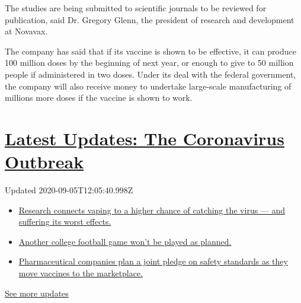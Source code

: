 The studies are being submitted to scientific journals to be reviewed
for publication, said Dr. Gregory Glenn, the president of research and
development at Novavax.

The company has said that if its vaccine is shown to be effective, it
can produce 100 million doses by the beginning of next year, or enough
to give to 50 million people if administered in two doses. Under its
deal with the federal government, the company will also receive money to
undertake large-scale manufacturing of millions more doses if the
vaccine is shown to work.

\hypertarget{latest-updates-the-coronavirus-outbreak}{%
\section{\texorpdfstring{\href{https://www.nytimes3xbfgragh.onion/2020/09/04/world/covid-19-coronavirus.html?action=click\&pgtype=Article\&state=default\&region=MAIN_CONTENT_1\&context=storylines_live_updates}{Latest
Updates: The Coronavirus
Outbreak}}{Latest Updates: The Coronavirus Outbreak}}\label{latest-updates-the-coronavirus-outbreak}}

Updated 2020-09-05T12:05:40.998Z

\begin{itemize}
\tightlist
\item
  \href{https://www.nytimes3xbfgragh.onion/2020/09/04/world/covid-19-coronavirus.html?action=click\&pgtype=Article\&state=default\&region=MAIN_CONTENT_1\&context=storylines_live_updates\#link-1654f6ad}{Research
  connects vaping to a higher chance of catching the virus --- and
  suffering its worst effects.}
\item
  \href{https://www.nytimes3xbfgragh.onion/2020/09/04/world/covid-19-coronavirus.html?action=click\&pgtype=Article\&state=default\&region=MAIN_CONTENT_1\&context=storylines_live_updates\#link-52e4198a}{Another
  college football game won't be played as planned.}
\item
  \href{https://www.nytimes3xbfgragh.onion/2020/09/04/world/covid-19-coronavirus.html?action=click\&pgtype=Article\&state=default\&region=MAIN_CONTENT_1\&context=storylines_live_updates\#link-181cef0}{Pharmaceutical
  companies plan a joint pledge on safety standards as they move
  vaccines to the marketplace.}
\end{itemize}

\href{https://www.nytimes3xbfgragh.onion/2020/09/04/world/covid-19-coronavirus.html?action=click\&pgtype=Article\&state=default\&region=MAIN_CONTENT_1\&context=storylines_live_updates}{See
more updates}

